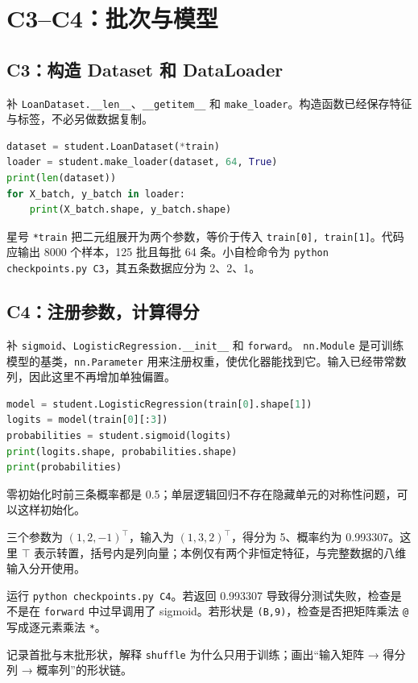 \documentclass[UTF8,a4paper,11pt,fontset=fandol]{ctexart}
\begin{document}
\section{C3--C4：批次与模型}
\subsection{C3：构造 Dataset 和 DataLoader}
补 \texttt{LoanDataset.\_\_len\_\_}、\texttt{\_\_getitem\_\_} 和 \texttt{make\_loader}。构造函数已经保存特征与标签，不必另做数据复制。
\begin{lstlisting}[language=Python]
dataset = student.LoanDataset(*train)
loader = student.make_loader(dataset, 64, True)
print(len(dataset))
for X_batch, y_batch in loader:
    print(X_batch.shape, y_batch.shape)
\end{lstlisting}
星号 \texttt{*train} 把二元组展开为两个参数，等价于传入 \texttt{train[0], train[1]}。代码应输出 8000 个样本，125 批且每批 64 条。小自检命令为 \texttt{python checkpoints.py C3}，其五条数据应分为 2、2、1。
\subsection{C4：注册参数，计算得分}
补 \texttt{sigmoid}、\texttt{LogisticRegression.\_\_init\_\_} 和 \texttt{forward}。
\texttt{nn.Module} 是可训练模型的基类，\texttt{nn.Parameter} 用来注册权重，使优化器能找到它。输入已经带常数列，因此这里不再增加单独偏置。
\begin{lstlisting}[language=Python]
model = student.LogisticRegression(train[0].shape[1])
logits = model(train[0][:3])
probabilities = student.sigmoid(logits)
print(logits.shape, probabilities.shape)
print(probabilities)
\end{lstlisting}
零初始化时前三条概率都是 0.5；单层逻辑回归不存在隐藏单元的对称性问题，可以这样初始化。
\begin{examplebox}
三个参数为 $(1,2,-1)^\top$，输入为 $(1,3,2)^\top$，得分为 5、概率约为 0.993307。这里 $\top$ 表示转置，括号内是列向量；本例仅有两个非恒定特征，与完整数据的八维输入分开使用。
\end{examplebox}
运行 \texttt{python checkpoints.py C4}。若返回 0.993307 导致得分测试失败，检查是不是在 \texttt{forward} 中过早调用了 sigmoid。若形状是 \texttt{(B,9)}，检查是否把矩阵乘法 \texttt{@} 写成逐元素乘法 \texttt{*}。
\begin{questionbox}[验收证据]
记录首批与末批形状，解释 \texttt{shuffle} 为什么只用于训练；画出“输入矩阵 → 得分列 → 概率列”的形状链。
\end{questionbox}
\clearpage
\end{document}

